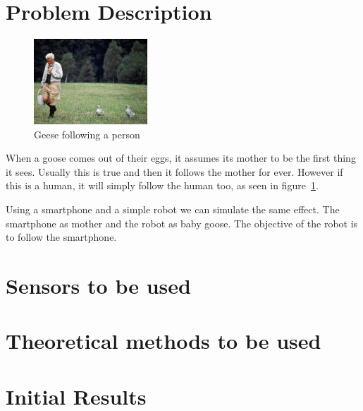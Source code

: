 \documentclass{article}
\author{Arian Stolwijk}
\begin{document}
\section{Problem Description}

\begin{figure}
  \vspace{-30pt}
  \begin{center}
    \includegraphics[width=0.38\textwidth]{geese.jpg}
    \vspace{-20pt}
  \end{center}
  \caption{Geese following a person}
  \label{fig:geese}
  \vspace{-20pt}
\end{figure}

When a goose comes out of their eggs, it assumes its mother to be the first
thing it sees. Usually this is true and then it follows the mother for ever.
However if this is a human, it will simply follow the human too, as seen in
figure~\ref{fig:geese}.

Using a smartphone and a simple robot we can simulate the same effect. The
smartphone as mother and the robot as baby goose. The objective of the robot is
to follow the smartphone.

\section{Sensors to be used}



\section{Theoretical methods to be used}

\section{Initial Results}
\end{document}
